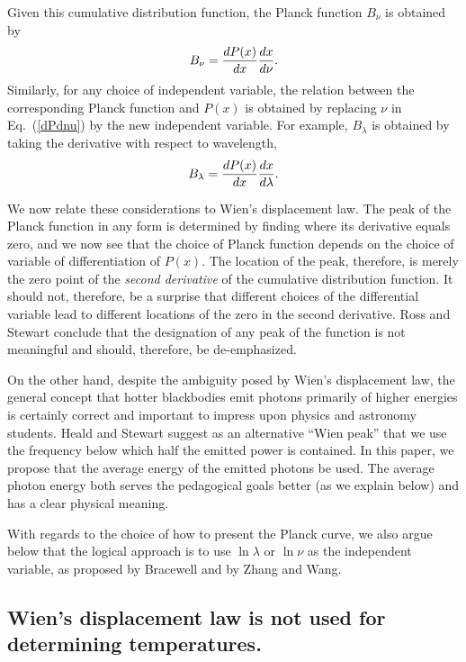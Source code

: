 \documentclass[12pt,aps,prb,preprint]{revtex4}   %
\begin{document}
Given this cumulative distribution function, the Planck function $B_\nu$ is obtained by 
\begin{equation}
\label{dPdnu}
B_\nu = {dP(x) \over dx} {dx \over d\nu}.
\end{equation}
Similarly, for any choice of independent variable, the relation between the corresponding Planck function and $P(x)$ is obtained by replacing $\nu$ in Eq.~(\ref{dPdnu}) by the new independent variable.  For example, $B_\lambda$ is obtained by taking the derivative with respect to wavelength,
\begin{equation}
\label{dPxdlam}
B_\lambda = {dP(x) \over dx} {dx \over d\lambda}.
\end{equation}

We now relate these considerations to Wien's displacement law.  The peak of the Planck function in any form is determined by finding where its derivative equals zero, and we now see that the choice of Planck function depends on the choice of variable of differentiation of $P(x)$.  The location of the peak, therefore, is merely the zero point of the {\it second derivative} of the cumulative distribution function.  It should not, therefore, be a surprise that different choices of the differential variable lead to different locations of the zero in the second derivative.  Ross\cite{Ross} and Stewart\cite{Stewart} conclude that the designation of any peak of the function is not meaningful and should, therefore, be de-emphasized.  

On the other hand, despite the ambiguity posed by Wien's displacement law, the general concept that hotter blackbodies emit photons primarily of higher energies is certainly correct and important to impress upon physics and astronomy students.  Heald\cite{Heald} and Stewart\cite{Stewart} suggest as an alternative ``Wien peak'' that we use the frequency below which half the emitted power is contained.  In this paper, we propose that the average energy of the emitted photons be used.  The average photon energy both serves the pedagogical goals better (as we explain below) and has a clear physical meaning.

With regards to the choice of how to present the Planck curve, we also argue below that the logical approach is to use $\ln\lambda$ or $\ln\nu$ as the independent variable, as proposed by Bracewell\cite{Bracewell} and by Zhang and Wang.\cite{ZW} 

\subsection{Wien's displacement law is not used for determining temperatures.}
\end{document}
